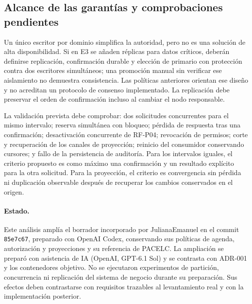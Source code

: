 \subsection{Alcance de las garantías y comprobaciones pendientes}

Un único escritor por dominio simplifica la autoridad, pero no es una solución
de alta disponibilidad. Si en E3 se añaden réplicas para datos críticos, deberán
definirse replicación, confirmación durable y elección de primario con protección
contra dos escritores simultáneos; una promoción manual sin verificar ese
aislamiento no demuestra consistencia. Las políticas anteriores orientan ese
diseño y no acreditan un protocolo de consenso implementado. La replicación
debe preservar el orden de confirmación incluso al cambiar el nodo responsable.

La validación prevista debe comprobar: dos solicitudes concurrentes para el
mismo intervalo; reserva simultánea con bloqueo; pérdida de respuesta tras una
confirmación; desactivación concurrente de RF-P04; revocación de permisos;
corte y recuperación de los canales de
proyección; reinicio del consumidor conservando cursores; y fallo de la
persistencia de auditoría. Para los intervalos iguales, el criterio propuesto
es como máximo una confirmación y un resultado explícito para la otra solicitud.
Para la proyección, el criterio es convergencia sin pérdida ni duplicación
observable después de recuperar los cambios conservados en el origen.

\paragraph{Estado.}
Este análisis amplía el borrador incorporado por JulianaEmanuel en el commit
\texttt{85e7c67}, preparado con OpenAI Codex, conservando sus políticas de agenda,
autorización y proyecciones y su referencia de PACELC. La ampliación se preparó
con asistencia de IA (OpenAI, GPT-6.1 Sol) y se contrasta con ADR-001 y los
contenedores objetivo. No se ejecutaron
experimentos de partición, concurrencia ni replicación del sistema de negocio
durante su preparación. Sus efectos deben contrastarse con requisitos trazables
al levantamiento real y con la implementación posterior.
